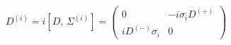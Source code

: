\begin{equation}\label{Dto} 
D^{(i)}=i[D,\,\Sigma^{(i)}]=\left(
\begin{array}{cc}
0&-i\sigma_i D^{(+)}\\
iD^{(-)}\sigma_i&0
\end{array}\right)
\end{equation}

